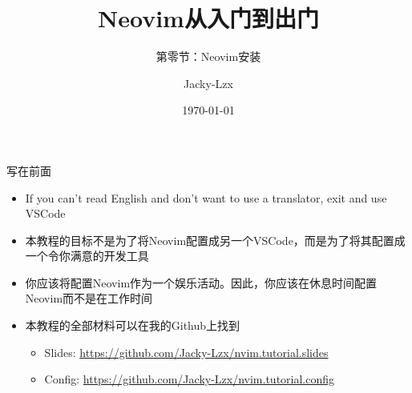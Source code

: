 \documentclass[aspectratio=169]{ctexbeamer}
\title{Neovim从入门到出门}
\subtitle{第零节：Neovim安装}
\author{Jacky-Lzx}
\date{\today}
\begin{document}
\begin{frame}
  \titlepage
\end{frame}

\begin{frame}{写在前面}
  \begin{itemize}
    \item If you can't read English and don't want to use a translator, exit and use VSCode
    \item 本教程的目标不是为了将Neovim配置成另一个VSCode，而是为了将其配置成一个令你满意的开发工具
    \item 你应该将配置Neovim作为一个娱乐活动。因此，你应该在休息时间配置Neovim而不是在工作时间 %
    \item 本教程的全部材料可以在我的Github上找到
      \begin{itemize}
        \item Slides: \url{https://github.com/Jacky-Lzx/nvim.tutorial.slides}
        \item Config: \url{https://github.com/Jacky-Lzx/nvim.tutorial.config}
      \end{itemize}
  \end{itemize}
\end{frame}
\end{document}
